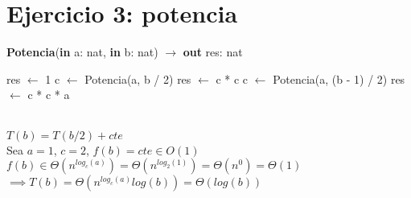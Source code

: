 \section{Ejercicio 3: potencia}

\begin{algorithm}[H]
\caption{
    \textbf{Potencia}(\textbf{in} a: nat, \textbf{in} b: nat) $\to$ \textbf{out} res: nat
}
\begin{algorithmic}[1]
        \State res $\gets$ 1
        \State c $\gets$ Potencia(a, b / 2)
        \State res $\gets$ c * c
    \Else
        \State c $\gets$ Potencia(a, (b - 1) / 2)
        \State res $\gets$ c * c * a
    \EndIf
\end{algorithmic}
\Complexity{} \\
$T(b) = T(b/2) + cte$ \\
Sea $a=1$, $c=2$, $f(b) = cte \in O(1)$ \\
$f(b) \in \Theta(n^{log_c(a)}) = \Theta(n^{log_2(1)}) = \Theta(n^0) = \Theta(1)$ \\
$\implies T(b) = \Theta(n^{log_c(a)} log(b)) = \Theta(log(b))$
\end{algorithm}
